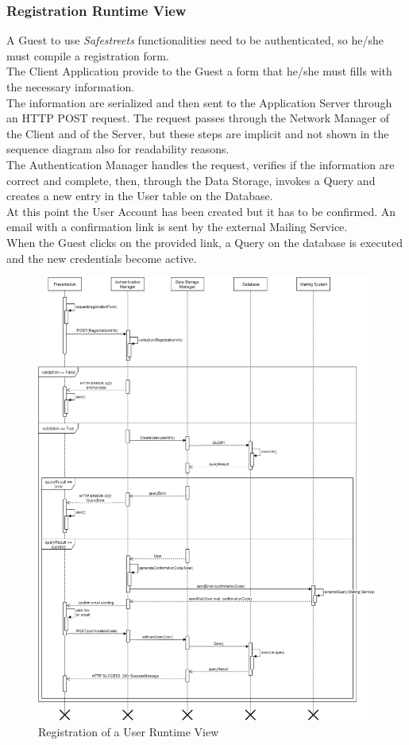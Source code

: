\subsubsection{Registration Runtime View}
A Guest to use \textit{Safestreets} functionalities need to be authenticated, so he/she must compile a registration form.\\
The Client Application provide to the Guest a form that he/she must fills with the necessary information.\\
The information are serialized and then sent to the Application Server through an HTTP POST request. The request passes through the Network Manager of the Client and of the Server, but these steps are implicit and not shown in the sequence diagram also for readability reasons.\\
The Authentication Manager handles the request, verifies if the information are correct and complete, then, through the Data Storage, invokes a Query and creates a new entry in the User table on the Database.\\
At this point the User Account has been created but it has to be confirmed. An email with a confirmation link is sent by the external Mailing Service.\\
When the Guest clicks on the provided link, a Query on the database is executed and the new credentials become active.
\begin{figure}[H]
          \includegraphics[scale=0.4]{Images/Seq_registration.png}
        \caption{Registration of a User Runtime View}
\end{figure}

